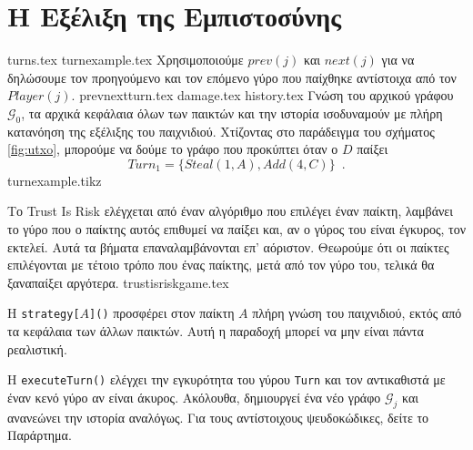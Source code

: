 \section{Η Εξέλιξη της Εμπιστοσύνης}
  {turns.tex}
  {turnexample.tex}
  Χρησιμοποιούμε $prev\left(j\right)$ και $next\left(j\right)$ για να δηλώσουμε τον προηγούμενο και τον επόμενο γύρο που
  παίχθηκε αντίστοιχα από τον $Player\left(j\right)$.
  {prevnextturn.tex}
  {damage.tex}
  {history.tex}
  Γνώση του αρχικού γράφου $\mathcal{G}_0$, τα αρχικά κεφάλαια όλων των παικτών και την ιστορία ισοδυναμούν με πλήρη κατανόηση
  της εξέλιξης του παιχνιδιού. Χτίζοντας στο παράδειγμα του σχήματος \ref{fig:utxo}, μπορούμε να δούμε το γράφο που προκύπτει
  όταν ο $D$ παίξει
  \begin{equation}
  \label{turnexample}
     Turn_1 = \{Steal\left(1, A\right), Add\left(4, C\right)\} \enspace.
  \end{equation}
  {turnexample.tikz}

  Το \textlatin{Trust Is Risk} ελέγχεται από έναν αλγόριθμο που επιλέγει έναν παίκτη, λαμβάνει το γύρο που ο παίκτης αυτός
  επιθυμεί να παίξει και, αν ο γύρος του είναι έγκυρος, τον εκτελεί. Αυτά τα βήματα επαναλαμβάνονται επ' αόριστον. Θεωρούμε
  ότι οι παίκτες επιλέγονται με τέτοιο τρόπο που ένας παίκτης, μετά από τον γύρο του, τελικά θα ξαναπαίξει αργότερα.
  {trustisriskgame.tex}

  Η \textlatin{\texttt{strategy[}$A$\texttt{]()}} προσφέρει στον παίκτη $A$ πλήρη γνώση του παιχνιδιού, εκτός από τα κεφάλαια των άλλων
  παικτών. Αυτή η παραδοχή μπορεί να μην είναι πάντα ρεαλιστική.

  Η \textlatin{\texttt{executeTurn()}} ελέγχει την εγκυρότητα του γύρου \texttt{Turn} και τον αντικαθιστά με έναν κενό γύρο αν είναι
  άκυρος. Ακόλουθα, δημιουργεί ένα νέο γράφο $\mathcal{G}_j$ και ανανεώνει την ιστορία αναλόγως. Για τους αντίστοιχους
  ψευδοκώδικες, δείτε το Παράρτημα.
